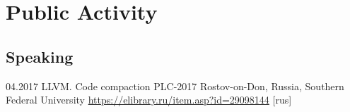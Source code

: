 \documentclass[11pt,a4paper]{moderncv}
\newcommand{\EngRus}[2]{#1}
\newcommand{\BirthPlaceOfValour}{\EngRus{Rostov-on-Don, Russia}{Ростов-на-Дону, Россия}}
\newcommand{\WorkSingleDate}[2]{\small{#1.#2}}
\begin{document}
\section{\EngRus{Public Activity}{Публичная деятельность}}
  \subsection{\EngRus{Speaking}{Конференции}}
    \cventry
      {\WorkSingleDate{04}{2017}}
      {\EngRus{LLVM. Code compaction}{Преобразование по уплотнению кода в LLVM}}
      {\EngRus{PLC-2017}{Языки программирования и компиляторы 2017}}
      {\BirthPlaceOfValour, \EngRus{Southern Federal University}{Южный Федеральный Университет}}
      {\newline\url{https://elibrary.ru/item.asp?id=29098144} \EngRus{[rus]}{}}
      {}{}
\end{document}
